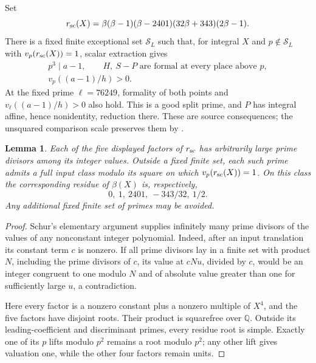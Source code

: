 \documentclass[11pt,a4paper]{article}
\newtheorem{lemma}[theorem]{Lemma}
\newcommand{\Q}{\mathbb Q}\newcommand{\Z}{\mathbb Z}
\begin{document}
Set
\[
 r_{\rm sc}(X)=\beta(\beta-1)(\beta-2401)(32\beta+343)(2\beta-1).
\]
There is a fixed finite exceptional set $\mathcal S_L$ such that,
for integral $X$ and $p\notin\mathcal S_L$ with
$v_p(r_{\rm sc}(X))=1$, scalar extraction gives
\begin{equation}\label{eq:scalar}
 \begin{gathered}
 p^3\mid a-1,\qquad H,\ S-P\text{ are formal at every place above }p,\\
                         v_p((a-1)/h)>0.
 \end{gathered}
\end{equation}
At the fixed prime $\ell=76249$, formality of both points and
$v_\ell((a-1)/h)>0$ also hold. This is a good split prime, and
$P$ has integral affine, hence nonidentity, reduction there.
These are source consequences; the unsquared comparison scale
preserves them by \cite{Unit}.

\begin{lemma}\label{lem:contacts}
Each of the five displayed factors of $r_{\rm sc}$ has arbitrarily
large prime divisors among its integer values. Outside a fixed
finite set, each such prime admits a full input class modulo its
square on which $v_p(r_{\rm sc}(X))=1$. On this class the
corresponding residue of $\beta(X)$ is, respectively,
\begin{equation}\label{eq:contacts}
                         0,\ 1,\ 2401,\ -343/32,\ 1/2.
\end{equation}
Any additional fixed finite set of primes may be avoided.
\end{lemma}
\begin{proof}
Schur's elementary argument supplies infinitely many prime divisors
of the values of any nonconstant integer polynomial. Indeed, after
an input translation its constant term $c$ is nonzero. If all prime
divisors lay in a finite set with product $N$, including the prime
divisors of $c$, its value at $cNu$, divided by $c$, would be an
integer congruent to one modulo $N$ and of absolute value greater
than one for sufficiently large $u$, a contradiction.

Here every factor is a nonzero constant plus a nonzero multiple of
$X^4$, and the five factors have disjoint roots. Their product is
squarefree over $\Q$. Outside its leading-coefficient and
discriminant primes, every residue root is simple. Exactly one of
its $p$ lifts modulo $p^2$ remains a root modulo $p^2$; any other
lift gives valuation one, while the other four factors remain units.
\end{proof}
\end{document}
